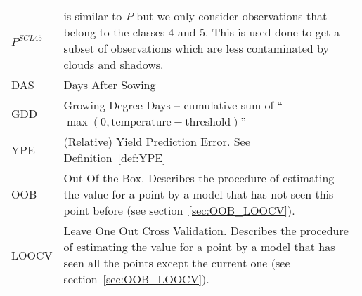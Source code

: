 \begin{longtable}{p{0.12\linewidth} p{0.87\linewidth}}
$P^{SCL45}$	
		& is similar to $P$ but we only consider observations that belong to the classes 4 and 5. This is used done to get a subset of observations which are less contaminated by clouds and shadows.\\

DAS	
		& Days After Sowing\\

GDD	
		& Growing Degree Days -- cumulative sum of ``$\max(0, \text{temperature}-\text{threshold})$''\\

YPE 	
		& (Relative) Yield Prediction Error. See Definition~\ref{def:YPE}\\

OOB 	
		& Out Of the Box. Describes the procedure of  estimating the value for a point by a model that has not seen this point before (see section~\ref{sec:OOB_LOOCV}).\\

LOOCV 	
		& Leave One Out Cross Validation. Describes the procedure of estimating the value for a point by a model that has seen all the points except the current one (see section~\ref{sec:OOB_LOOCV}).
\end{longtable} 

